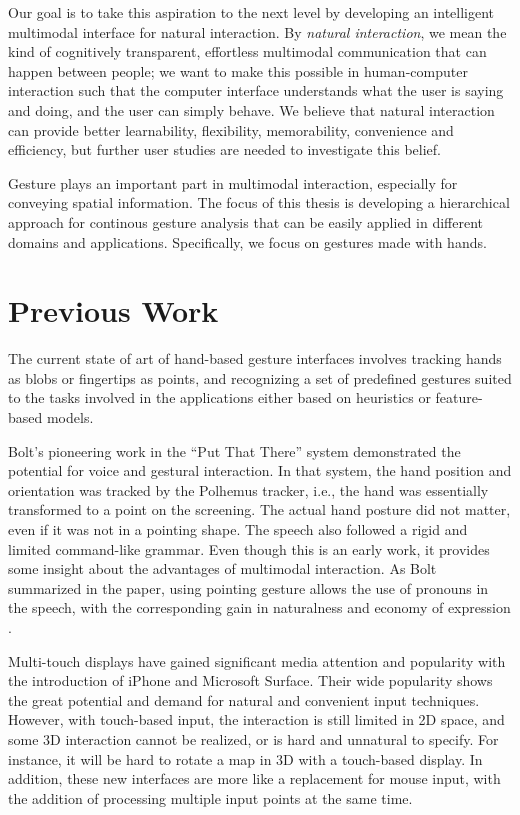 Our goal is to take this aspiration to the next level by developing an
intelligent multimodal interface for natural interaction. By \textit{natural
interaction}, we mean the kind of cognitively transparent, effortless multimodal
communication that can happen between people; we want to make this possible in
human-computer interaction such that the computer interface understands what the
user is saying and doing, and the user can simply behave. We believe that
natural interaction can provide better learnability, flexibility, memorability,
convenience and efficiency, but further user studies are needed to investigate
this belief.

Gesture plays an important part in multimodal interaction, especially for
conveying spatial information. The focus of this thesis is developing a
hierarchical approach for continous gesture analysis that can be easily
applied in different domains and applications. Specifically, we focus on
gestures made with hands.

\section{Previous Work}
The current state of art of hand-based gesture interfaces involves tracking
hands as blobs or fingertips as points, and recognizing a set of
predefined gestures suited to the tasks involved in the applications
either based on heuristics or feature-based models.

Bolt's pioneering work in the ``Put That There'' system \cite{Bolt80} demonstrated the potential for voice and gestural interaction.  In that system, the hand position and orientation was tracked by the Polhemus tracker, i.e., the hand was essentially transformed to a point on the screening. The actual hand posture did not matter, even if it was not in a pointing shape. The speech also followed a rigid and limited command-like grammar. Even though this is an early work, it provides some insight about the advantages of multimodal interaction. As Bolt summarized in the paper, using pointing gesture allows the use of pronouns in the speech, with the corresponding gain in naturalness and economy of expression \cite{Bolt80}. 

Multi-touch displays have gained significant media attention and popularity with the introduction of iPhone\textsuperscript{\textregistered} and Microsoft Surface\textsuperscript{\textregistered}. Their wide popularity shows the great potential and demand for natural and convenient input techniques. However, with touch-based input, the interaction is still limited in 2D space, and some 3D interaction cannot be realized, or is hard and unnatural to specify. For instance, it will be hard to rotate a map in 3D with a touch-based display. In addition, these new interfaces are more like a replacement for mouse input, with the addition of processing multiple input points at the same time. 

